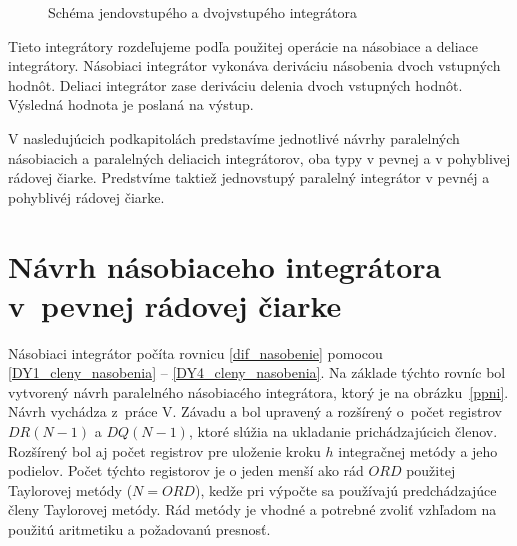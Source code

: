 \begin{figure}[H]
\centering
{} \hspace{1.0cm}
\label{schema_i_ndi}
\caption{Schéma jendovstupého a dvojvstupého integrátora}
\end{figure}

Tieto integrátory rozdeľujeme podľa použitej operácie na násobiace a deliace integrátory. Násobiaci integrátor vykonáva deriváciu násobenia dvoch vstupných hodnôt. Deliaci integrátor zase deriváciu delenia dvoch vstupných hodnôt. Výsledná hodnota je poslaná na výstup.

V nasledujúcich podkapitolách predstavíme jednotlivé návrhy paralelných násobiacich a paralelných deliacich integrátorov, oba typy v pevnej a v pohyblivej rádovej čiarke. Predstvíme taktiež jednovstupý paralelný integrátor v pevnéj a pohyblivéj rádovej čiarke.
\bigskip


\section{Návrh násobiaceho integrátora v~pevnej rádovej čiarke}
Násobiaci integrátor počíta rovnicu \eqref{dif_nasobenie} pomocou \eqref{DY1_cleny_nasobenia} -- \eqref{DY4_cleny_nasobenia}. Na základe týchto rovníc bol vytvorený návrh paralelného násobiacého integrátora, ktorý je na obrázku~\ref{ppni}. Návrh vychádza z~práce V. Závadu \cite{ZavadaBP} a bol upravený a rozšírený o~počet registrov $ DR(N-1) $ a $ DQ(N-1) $, ktoré slúžia na ukladanie prichádzajúcich členov. Rozšírený bol aj počet registrov pre uloženie kroku $ h $ integračnej metódy a jeho podielov. Počet týchto registorov je o jeden menší ako rád $ ORD $ použitej Taylorovej metódy ($ N = ORD $), kedže pri výpočte sa používajú predchádzajúce členy Taylorovej metódy. Rád metódy je vhodné a potrebné zvoliť vzhľadom na použitú aritmetiku a požadovanú presnosť.

